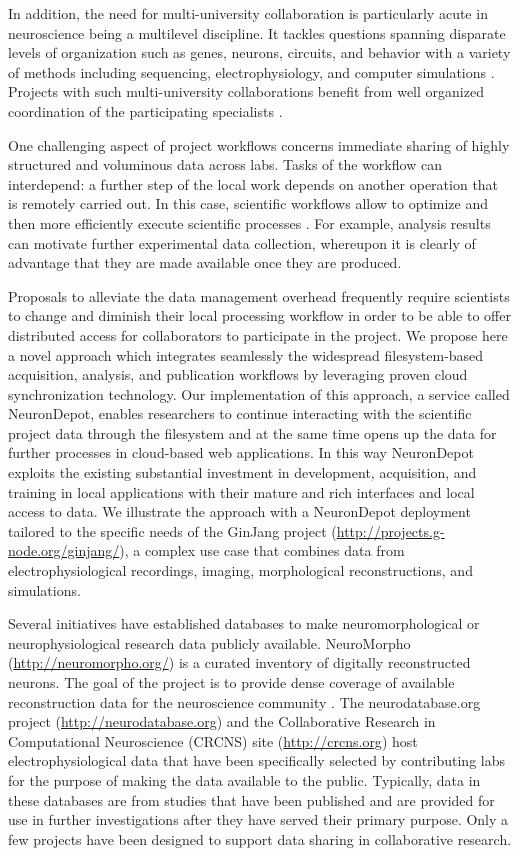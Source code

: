 \documentclass{frontiersSCNS} %
\begin{document}
In addition, the need for multi-university collaboration is particularly acute
in neuroscience being a multilevel discipline. It tackles questions spanning
disparate levels of organization such as genes, neurons, circuits, and behavior
with a variety of methods including sequencing, electrophysiology, and computer
simulations \citep{shepherd_human_1998}. Projects with such multi-university
collaborations benefit from well organized coordination of the participating
specialists \citep{cummings_coordination_2007}.

One challenging aspect of project workflows concerns immediate sharing of
highly structured and voluminous data across labs. Tasks of the workflow can
interdepend: a further step of the local work depends on another operation that
is remotely carried out. In this case, scientific workflows allow to optimize
and then more efficiently execute scientific processes
\citep{ludascher_scientific_2009}. For example, analysis results can motivate
further experimental data collection, whereupon it is clearly of advantage that
they are made available once they are produced.

Proposals to alleviate the data management overhead frequently require
scientists to change and diminish their local processing workflow in order to
be able to offer distributed access for collaborators to participate in the
project. We propose here a novel approach which integrates seamlessly the
widespread filesystem-based acquisition, analysis, and publication workflows by
leveraging proven cloud synchronization technology. Our implementation of this
approach, a service called NeuronDepot, enables researchers to continue
interacting with the scientific project data through the filesystem and at the
same time opens up the data for further processes in cloud-based web
applications. In this way NeuronDepot exploits the existing substantial
investment in development, acquisition, and training in local applications with
their mature and rich interfaces and local access to data. We illustrate the
approach with a NeuronDepot deployment tailored to the specific needs of the
GinJang project (\url{http://projects.g-node.org/ginjang/}), a complex use case
that combines data from electrophysiological recordings, imaging, morphological
reconstructions, and simulations.

Several initiatives have established databases to make neuromorphological or
neurophysiological research data publicly available. NeuroMorpho
(\url{http://neuromorpho.org/}) is a curated inventory of digitally
reconstructed neurons. The goal of the project is to provide dense coverage of
available reconstruction data for the neuroscience community
\citep{Ascoli2007}. The neurodatabase.org project
(\url{http://neurodatabase.org}) and the Collaborative Research in
Computational Neuroscience (CRCNS) site (\url{http://crcns.org}) host
electrophysiological data that have been specifically selected by contributing
labs for the purpose of making the data available to the public.  Typically,
data in these databases are from studies that have been published and are
provided for use in further investigations after they have served their primary
purpose. Only a few projects have been designed to support data sharing in
collaborative research.
\end{document}

